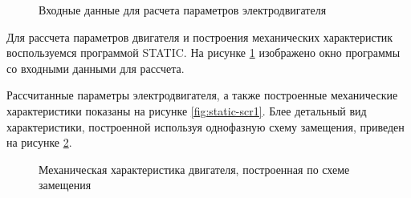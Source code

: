         \begin{figure}[h!]
            \caption{Входные данные для расчета параметров электродвигателя}
            \label{fig:static-scr2}
        \end{figure}       

        Для рассчета параметров двигателя и построения механических
        характеристик воспользуемся программой STATIC.  На рисунке
        \ref{fig:static-scr2} изображено окно программы со входными данными для
        рассчета.

        Рассчитанные параметры электродвигателя, а также построенные
        механические характеристики показаны на рисунке \ref{fig:static-scr1}.
        Блее детальный вид характеристики, построенной используя однофазную
        схему замещения, приведен на рисунке \ref{fig:motor-mh1}.  %

        \begin{figure}[h!]
            \caption{Механическая характеристика двигателя, построенная по схеме замещения}
            \label{fig:motor-mh1}
        \end{figure}

